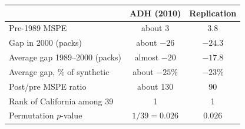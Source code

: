 \begin{tabular}{lcc}
\toprule
 & ADH (2010) & Replication \\
\midrule
Pre-1989 MSPE & about 3 & 3.8 \\
Gap in 2000 (packs) & about $-26$ & $-24.3$ \\
Average gap 1989--2000 (packs) & almost $-20$ & $-17.8$ \\
Average gap, \% of synthetic & about $-25$\% & $-23$\% \\
Post/pre MSPE ratio & about 130 & 90 \\
Rank of California among 39 & 1 & 1 \\
Permutation $p$-value & $1/39 = 0.026$ & $0.026$ \\
\bottomrule
\end{tabular}
